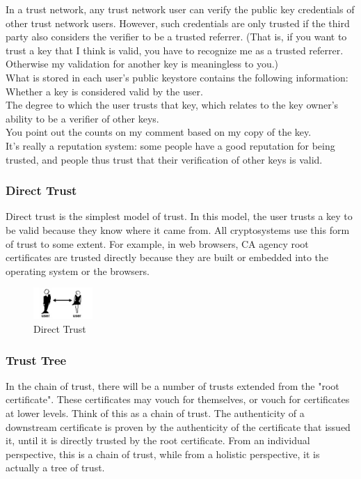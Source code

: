 In a trust network, any trust network user can verify the public key credentials of other 
trust network users. However, such credentials are only trusted if the third party also 
considers the verifier to be a trusted referrer. (That is, if you want to trust a key that 
I think is valid, you have to recognize me as a trusted referrer. Otherwise my validation 
for another key is meaningless to you.)
\\
What is stored in each user's public keystore contains the following information:
\\
Whether a key is considered valid by the user.
\\
The degree to which the user trusts that key, which relates to the key owner's 
ability to be a verifier of other keys.
\\
You point out the counts on my comment based on my copy of the key.
\\
It's really a reputation system: some people have a good reputation for being 
trusted, and people thus trust that their verification of other keys is valid.

\subsubsection{Direct Trust}
Direct trust is the simplest model of trust. In this model, the user trusts a 
key to be valid because they know where it came from\cite{b27}. All cryptosystems use this 
form of trust to some extent. For example, in web browsers, CA agency root 
certificates are trusted directly because they are built or embedded into the operating system 
or the browsers\cite{b28}.

\begin{figure}[H] %
    \centering %
    \includegraphics[width=0.2\textwidth]{figures/directTrust.png} %
    \caption{Direct Trust} %
    \label{Fig.3: Direct Trust} %
\end{figure}


\subsubsection{Trust Tree}
In the chain of trust, there will be a number of trusts extended from the "root 
certificate". These certificates may vouch for themselves, or vouch for certificates 
at lower levels. Think of this as a chain of trust\cite{b31}. The authenticity of a downstream 
certificate is proven by the authenticity of the certificate that issued it, until 
it is directly trusted by the root certificate. From an individual perspective, this 
is a chain of trust, while from a holistic perspective, it is actually a tree of trust\cite{b28}.

